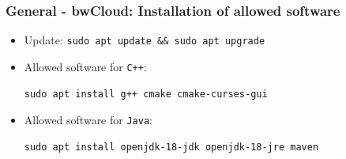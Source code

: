 \begin{frame}[fragile]
  \frametitle{General - bwCloud: Installation of allowed software}
    \begin{itemize}
        \item Update: \texttt{sudo apt update && sudo apt upgrade} \vspace{.5em}

        \item Allowed software for \texttt{C++}:\vspace*{-.2em}
        \begin{verbatim}
sudo apt install g++ cmake cmake-curses-gui
        \end{verbatim}

        \pause
        \item Allowed software for \texttt{Java}:\vspace*{-.2em}
        \begin{verbatim}
sudo apt install openjdk-18-jdk openjdk-18-jre maven
        \end{verbatim}
    \end{itemize}
\end{frame}

